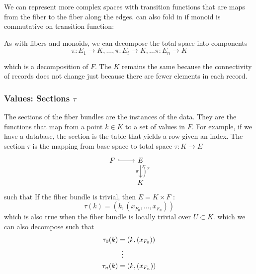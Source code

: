 \documentclass[../main.tex]{subfiles}
\begin{document}
We can represent more complex spaces with transition functions that are maps from the fiber to the fiber along the edges. can also fold in if monoid is commutative on transition function:


As with fibers and monoids, we can decompose the total space into components 
\begin{equation}
    \pi: E_1 \rightarrow K, \ldots, \pi: E_i \rightarrow K, \ldots \pi: E_n \rightarrow K
\end{equation}

which is a decomposition of $F$. The $K$ remains the same because the connectivity of records does not change just because there are fewer elements in each record.


\subsubsection{Values: Sections $\tau$}
\label{sec:data_section}
\label{sec:section_data}
The sections of the fiber bundles are the instances of the data. They are the functions that map from a point $k \in K$ to a set of values in $F$. For example, if we have a database, the section is the table that yields a row given an index. The section $\tau$ is the mapping from base space to total space $\tau: K\rightarrow E$ 
\begin{equation}
    \label{eq:section}
    \begin{tikzcd}
        F \arrow[r, hook] & E \arrow[d, "\pi"']           \\
        & K \arrow[u, "\tau"', bend right]
    \end{tikzcd}
\end{equation}
such that %
If the fiber bundle is trivial, then $E = K \times F$ \cite{rowlandFiberBundle,FiberBundle2020}:
\begin{equation}
    \label{eq:section_return}
    \tau(k) = (k, (x_{F_{0}}, \ldots, x_{F_{n}}))
\end{equation}
which is also true when the fiber bundle is locally trivial over $U \subset K$.
which we can also decompose such that
\begin{align}
\tau_{0}(k) &= (k, (x_{F_{0}}))\\
            & \vdotswithin{=}\\
\tau_{n}(k) &= (k, (x_{F_{n}}))
\end{align}
\end{document}
